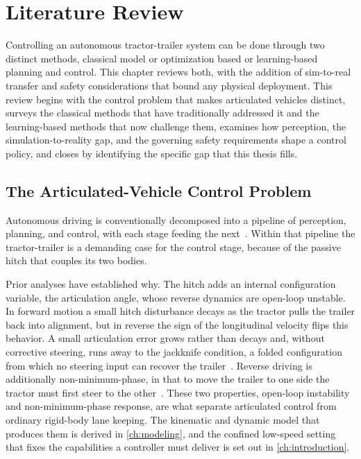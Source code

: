 \chapter{Literature Review}
\label{ch:literature_review}

Controlling an autonomous tractor-trailer system can be done through two distinct methods, classical model or optimization based or learning-based planning and control. This chapter reviews both, with the addition of sim-to-real transfer and safety considerations that bound any physical deployment. This review begins with the control problem that makes articulated vehicles distinct, surveys the classical methods that have traditionally addressed it and the learning-based methods that now challenge them, examines how perception, the simulation-to-reality gap, and the governing safety requirements shape a control policy, and closes by identifying the specific gap that this thesis fills.

\section{The Articulated-Vehicle Control Problem}

Autonomous driving is conventionally decomposed into a pipeline of perception, planning, and control, with each stage feeding the next~\cite{pendleton2017survey}. Within that pipeline the tractor-trailer is a demanding case for the control stage, because of the passive hitch that couples its two bodies.

Prior analyses have established why. The hitch adds an internal configuration variable, the articulation angle, whose reverse dynamics are open-loop unstable. In forward motion a small hitch disturbance decays as the tractor pulls the trailer back into alignment, but in reverse the sign of the longitudinal velocity flips this behavior. A small articulation error grows rather than decays and, without corrective steering, runs away to the jackknife condition, a folded configuration from which no steering input can recover the trailer~\cite{fancher2007directional}. Reverse driving is additionally non-minimum-phase, in that to move the trailer to one side the tractor must first steer to the other~\cite{altafini2001reversing}. These two properties, open-loop instability and non-minimum-phase response, are what separate articulated control from ordinary rigid-body lane keeping. The kinematic and dynamic model that produces them is derived in \cref{ch:modeling}, and the confined low-speed setting that fixes the capabilities a controller must deliver is set out in \cref{ch:introduction}.

